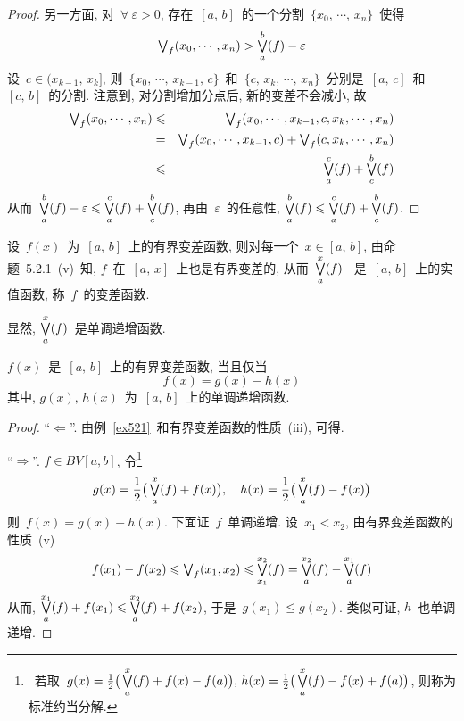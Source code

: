 \begin{proof}
另一方面, 对~$\forall~\varepsilon > 0$, 存在~$[a,\,b]$~的一个分割~$\{x_0,\, \cdots,\,x_n\}$~使得
\[
\textstyle{\bigvee}_{f}(x_0,\cdots,x_n) > \mathop{\textstyle{\bigvee}}\limits_a^b(f) - \varepsilon
\]
设~$c \in (x_{k-1},\,x_k]$, 则~$\{x_0,\, \cdots,\,x_{k-1},\,c\}$~和~$\{c,\, x_k,\, \cdots,\,x_n\}$~分别是~$[a,\,c]$~和~$[c,\,b]$~的分割. 注意到, 对分割增加分点后, 新的变差不会减小, 故
\begin{eqnarray*}
\textstyle{\bigvee}_{f}(x_0,\cdots,x_n) &\leqslant& \textstyle{\bigvee}_{f}(x_0,\cdots,x_{k-1},c,x_k,\cdots,x_n) \\
&=& \textstyle{\bigvee}_{f}(x_0,\cdots,x_{k-1},c) + \textstyle{\bigvee}_{f}(c,x_k,\cdots,x_n) \\
&\leqslant& \mathop{\textstyle{\bigvee}}\limits_a^c(f) + \mathop{\textstyle{\bigvee}}\limits_c^b(f)
\end{eqnarray*}
从而~$\mathop{\textstyle{\bigvee}}\limits_a^b(f) - \varepsilon \leqslant \mathop{\textstyle{\bigvee}}\limits_a^c(f) + \mathop{\textstyle{\bigvee}}\limits_c^b(f)$, 再由~$\varepsilon$~的任意性, $\mathop{\textstyle{\bigvee}}\limits_a^b(f) \leqslant \mathop{\textstyle{\bigvee}}\limits_a^c(f) + \mathop{\textstyle{\bigvee}}\limits_c^b(f)$.
\end{proof}

\begin{definition}
设~$f(x)$~为~$[a,\,b]$~上的有界变差函数, 则对每一个~$x \in [a,\,b]$, 由命题~5.2.1~(v)~知, $f$~在~$[a,\,x]$~上也是有界变差的, 从而~$\mathop{\textstyle{\bigvee}}\limits_a^x(f)$~
是~$[a,\,b]$~上的实值函数, 称~$f$~的变差函数.
\end{definition}

显然, $\mathop{\textstyle{\bigvee}}\limits_a^x(f)$~是单调递增函数.

\begin{theorem}
$f(x)$~是~$[a,\,b]$~上的有界变差函数, 当且仅当
\[
f(x) = g(x) - h(x)
\]
其中, $g(x),\,h(x)$~为~$[a,\,b]$~上的单调递增函数.
\end{theorem}

\begin{proof}
``$\Leftarrow$''. 由例~\ref{ex521}~和有界变差函数的性质~(iii), 可得.

``$\Rightarrow$''. $f \in BV[a,b]$, 令\footnote{~若取~$g(x) = \frac{1}{2}\big( \mathop{\textstyle{\bigvee}}\limits_a^x(f) + f(x) - f(a) \big), \, h(x) = \frac{1}{2}\big( \mathop{\textstyle{\bigvee}}\limits_a^x(f) - f(x) + f(a)\big)$, 则称为标准约当分解. }
\[
g(x) = \frac{1}{2}\big( \mathop{\textstyle{\bigvee}}\limits_a^x(f) + f(x)\big), \quad h(x) = \frac{1}{2}\big( \mathop{\textstyle{\bigvee}}\limits_a^x(f) - f(x)\big)
\]
则~$f(x) = g(x) - h(x)$. 下面证~$f$~单调递增. 设~$x_1 < x_2$, 由有界变差函数的性质~(v)
\[
f(x_1) - f(x_2) \leqslant \textstyle{\bigvee}_f(x_1,x_2) \leqslant \mathop{\textstyle{\bigvee}}\limits_{x_1}^{x_2}(f) =
\mathop{\textstyle{\bigvee}}\limits_{a}^{x_2}(f) - \mathop{\textstyle{\bigvee}}\limits_{a}^{x_1}(f)
\]
从而, $\mathop{\textstyle{\bigvee}}\limits_{a}^{x_1}(f) + f(x_1) \leqslant \mathop{\textstyle{\bigvee}}\limits_{a}^{x_2}(f) + f(x_2)$, 于是~$g(x_1) \leqslant g(x_2)$. 类似可证, $h$~也单调递增.
\end{proof}

